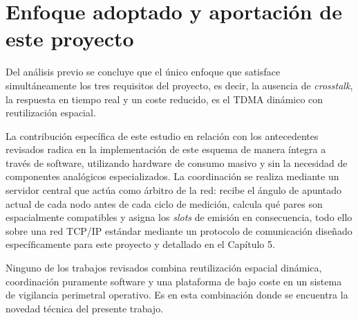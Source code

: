 \section{Enfoque adoptado y aportación de este proyecto}

Del análisis previo se concluye que el único enfoque que satisface simultáneamente los tres requisitos del proyecto, es decir, la ausencia de \textit{crosstalk}, la respuesta en tiempo real y un coste reducido, es el TDMA dinámico con reutilización espacial.

La contribución específica de este estudio en relación con los antecedentes revisados radica en la implementación de este esquema de manera íntegra a través de software, utilizando hardware de consumo masivo y sin la necesidad de componentes analógicos especializados. La coordinación se realiza mediante un servidor central que actúa como árbitro de la red: recibe el ángulo de apuntado actual de cada nodo antes de cada ciclo de medición, calcula qué pares son espacialmente compatibles y asigna los \textit{slots} de emisión en consecuencia, todo ello sobre una red TCP/IP estándar mediante un protocolo de comunicación diseñado específicamente para este proyecto y detallado en el Capítulo 5.

Ninguno de los trabajos revisados combina reutilización espacial dinámica, coordinación puramente software y una plataforma de bajo coste en un sistema de vigilancia perimetral operativo. Es en esta combinación donde se encuentra la novedad técnica del presente trabajo.
